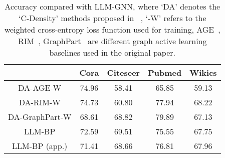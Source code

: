 \begin{table}[h]
\centering
\begin{tabular}{ccccc}
\hline
 & Cora & Citeseer & Pubmed & Wikics \\ \hline
DA-AGE-W & 74.96 & 58.41 & 65.85 & 59.13 \\
DA-RIM-W & 74.73 & 60.80 & 77.94 & 68.22 \\
DA-GraphPart-W & 68.61 & 68.82 & 79.89 & 67.13 \\ \hline
LLM-BP & 72.59 & 69.51 & 75.55 & 67.75 \\
LLM-BP (app.) & 71.41 & 68.66 & 76.81 & 67.96 \\ \hline
\end{tabular}
\caption{Accuracy compared with LLM-GNN, where `DA' denotes the `C-Density' methods proposed in ~\cite{chen2023label}, `-W' refers to the weighted cross-entropy loss function used for training,
AGE~\cite{cai2017active}, RIM~\cite{zhang2021rim}, GraphPart~\cite{ma2022partition} are different graph active learning baselines used in the original paper.}
\label{tab:compare_llm_gnn}
\end{table}